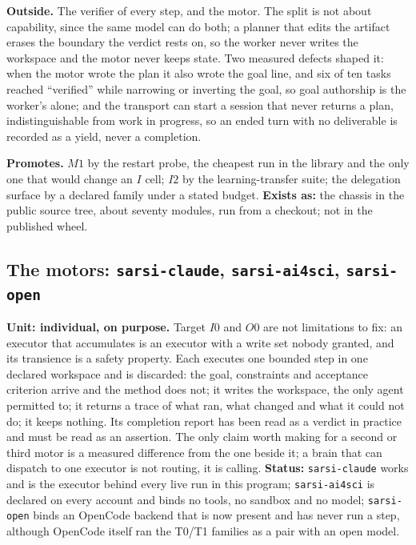 \textbf{Outside.} The verifier of every step, and the motor. The split is not about capability, since the same model can do both; a planner that edits the artifact erases the boundary the verdict rests on, so the worker never writes the workspace and the motor never keeps state. Two measured defects shaped it: when the motor wrote the plan it also wrote the goal line, and six of ten tasks reached ``verified'' while narrowing or inverting the goal, so goal authorship is the worker's alone; and the transport can start a session that never returns a plan, indistinguishable from work in progress, so an ended turn with no deliverable is recorded as a yield, never a completion.

\textbf{Promotes.} $M1$ by the restart probe, the cheapest run in the library and the only one that would change an $I$ cell; $I2$ by the learning-transfer suite; the delegation surface by a declared family under a stated budget. \textbf{Exists as:} the chassis in the public source tree, about seventy modules, run from a checkout; not in the published wheel.

\subsection{The motors: \texttt{sarsi-claude}, \texttt{sarsi-ai4sci}, \texttt{sarsi-open}}

\textbf{Unit: individual, on purpose.} Target $I0$ and $O0$ are not limitations to fix: an executor that accumulates is an executor with a write set nobody granted, and its transience is a safety property. Each executes one bounded step in one declared workspace and is discarded: the goal, constraints and acceptance criterion arrive and the method does not; it writes the workspace, the only agent permitted to; it returns a trace of what ran, what changed and what it could not do; it keeps nothing. Its completion report has been read as a verdict in practice and must be read as an assertion. The only claim worth making for a second or third motor is a measured difference from the one beside it; a brain that can dispatch to one executor is not routing, it is calling. \textbf{Status:} \texttt{sarsi-claude} works and is the executor behind every live run in this program; \texttt{sarsi-ai4sci} is declared on every account and binds no tools, no sandbox and no model; \texttt{sarsi-open} binds an OpenCode backend that is now present and has never run a step, although OpenCode itself ran the T0/T1 families as a pair with an open model.

